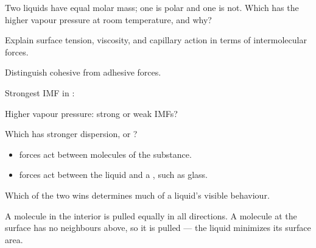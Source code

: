 \documentclass{apchem-notes}
\begin{document}
\begin{exitticket}
Two liquids have equal molar mass; one is polar and one is not. Which has
the higher vapour pressure at room temperature, and why?
\end{exitticket}


\begin{objectives}
  \item Explain surface tension, viscosity, and capillary action in terms of
        intermolecular forces.
  \item Distinguish cohesive from adhesive forces.
\end{objectives}


\begin{warmup}[3]
  \item Strongest IMF in : 
  \item Higher vapour pressure: strong or weak IMFs?
  \item Which has stronger dispersion,  or ?
\end{warmup}



\begin{itemize}[leftmargin=*,itemsep=0.25em]
  \item {} forces act between molecules of the
         substance.
  \item {} forces act between the liquid and a
        , such as glass.
\end{itemize}

Which of the two wins determines much of a liquid's visible behaviour.


A molecule in the interior is pulled equally in all directions. A molecule at
the surface has no neighbours above, so it is pulled
 --- the liquid minimizes its surface area.
\end{document}
